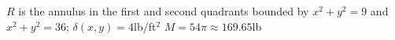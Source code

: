 {$R$ is the annulus in the first and second quadrants  bounded by $x^2+y^2=9$ and $x^2+y^2=36$; $\delta(x,y) = 4$lb/ft$^2$
}
{$M = 54\pi\approx 169.65$lb%
}
